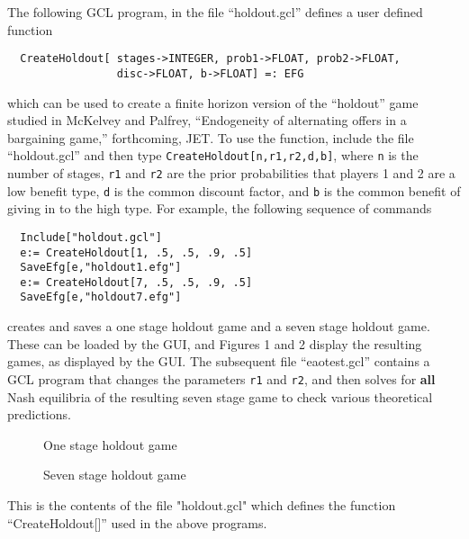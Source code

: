 The following GCL program, in the file ``holdout.gcl'' defines a user
defined function

\begin{verbatim}
  CreateHoldout[ stages->INTEGER, prob1->FLOAT, prob2->FLOAT, 
                 disc->FLOAT, b->FLOAT] =: EFG
\end{verbatim}

\noindent
which can be used to create a finite horizon version of the
``holdout'' game studied in McKelvey and Palfrey, ``Endogeneity of
alternating offers in a bargaining game,'' forthcoming, JET.  To use
the function, include the file ``holdout.gcl'' and then type
\verb+CreateHoldout[n,r1,r2,d,b]+, where \verb+n+ is the number of
stages, \verb+r1+ and \verb+r2+ are the prior probabilities that
players 1 and 2 are a low benefit type, \verb+d+ is the common
discount factor, and \verb+b+ is the common benefit of giving in to
the high type.  For example, the following sequence of commands

\begin{verbatim}
  Include["holdout.gcl"]
  e:= CreateHoldout[1, .5, .5, .9, .5]
  SaveEfg[e,"holdout1.efg"]
  e:= CreateHoldout[7, .5, .5, .9, .5]
  SaveEfg[e,"holdout7.efg"]
\end{verbatim}

\noindent
creates and saves a one stage holdout game and a seven stage holdout
game. These can be loaded by the GUI, and Figures 1 and 2 display the
resulting games, as displayed by the GUI.  The subsequent file
``eaotest.gcl'' contains a GCL program that changes the parameters
\verb+r1+ and \verb+r2+, and then solves for {\bf all} Nash equilibria
of the resulting seven stage game to check various theoretical predictions.

\begin{figure}[htp]
\caption{One stage holdout game}
\end{figure}
\begin{figure}[htp]
\caption{Seven stage holdout game}
\end{figure}

\newpage
\noindent
This is the contents of the file "holdout.gcl" which defines the
function ``CreateHoldout[]'' used in the above programs.

